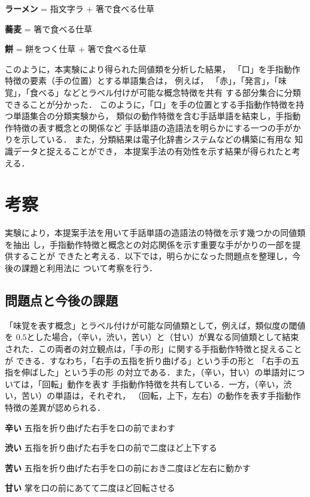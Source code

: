 \begin{list}{}{\setlength{\topsep}{3pt}}
\item [{\bf ラーメン}] = 指文字ラ + 箸で食べる仕草
\item [{\bf 蕎麦}]     = 箸で食べる仕草
\item [{\bf 餅}]      = 餅をつく仕草 + 箸で食べる仕草 
\end{list}

\noindent
このように，本実験により得られた同値類を分析した結果，
「口」を手指動作特徴の要素（手の位置）とする単語集合は，
例えば，
「赤」，「発言」，「味覚」，「食べる」などとラベル付けが可能な概念特徴を共有
する部分集合に分類できることが分かった．
このように，「口」を手の位置とする手指動作特徴を持つ単語集合の分類実験から，
類似の動作特徴を含む手話単語を結束し，手指動作特徴の表す概念との関係など
手話単語の造語法を明らかにする一つの手がかりを示している．
また，分類結果は電子化辞書システムなどの構築に有用な
知識データと捉えることができ，
本提案手法の有効性を示す結果が得られたと考える．

\section {考察}

実験により，本提案手法を用いて手話単語の造語法の特徴を示す幾つかの同値類を抽出
し，手指動作特徴と概念との対応関係を示す重要な手がかりの一部を提供することが
できたと考える．以下では，明らかになった問題点を整理し，今後の課題と利用法に
ついて考察を行う．

\subsection {問題点と今後の課題}

「味覚を表す概念」とラベル付けが可能な同値類として，例えば，類似度の閾値を
$0.5$とした場合，（辛い，渋い，苦い）と（甘い）が異なる同値類として結束
された．この両者の対立観点は，「手の形」に関する手指動作特徴と捉えることが
できる．すなわち，「右手の五指を折り曲げる」という手の形と
「右手の五指を伸ばした」という手の形
の対立である．また，（辛い，甘い）の単語対については，「回転」動作を表す
手指動作特徴を共有している．一方，（辛い，渋い，苦い）の単語は，それぞれ，
（回転，上下，左右）の動作を表す手指動作特徴の差異が認められる．

\begin{list}{}{\setlength{\topsep}{3pt}}
\item [{\bf 辛い}]
五指を折り曲げた右手を口の前でまわす
\item [{\bf 渋い}]
五指を折り曲げた右手を口の前で二度ほど上下する
\item [{\bf 苦い}]
五指を折り曲げた右手を口の前におき二度ほど左右に動かす
\item [{\bf 甘い}]
掌を口の前にあてて二度ほど回転させる
\end{list}

